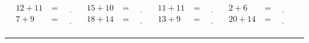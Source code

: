\documentclass{article}
\begin{document}
\begin{sloppy}
\begin{align*}
    {12} + {11} &= \underline{\hspace{1cm}} & {15} + {10} &= \underline{\hspace{1cm}} & {11} + {11} &= \underline{\hspace{1cm}} & {2} + {6} &= \underline{\hspace{1cm}} \\
    {7} + {9} &= \underline{\hspace{1cm}} & {18} + {14} &= \underline{\hspace{1cm}} & {13} + {9} &= \underline{\hspace{1cm}} & {20} + {14} &= \underline{\hspace{1cm}} \\
\end{align*}
\hrule
\end{sloppy}
\end{document}
